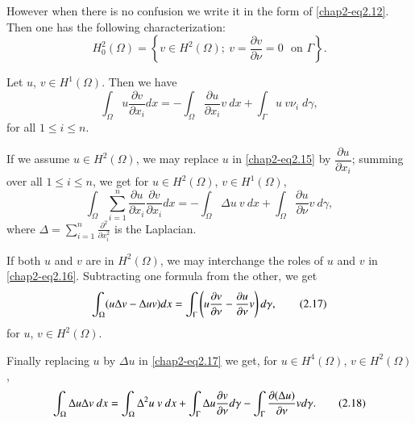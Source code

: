 However when there is no confusion we write it in the form of
\eqref{chap2-eq2.12}. Then one has the following characterization:
\begin{equation*}
H^{2}_{0}(\Omega)=\left\{v\in H^{2}(\Omega);\ v=\frac{\partial
  v}{\partial\nu}=0\text{~ on~
}\Gamma\right\}.\tag{2.14}\label{chap2-eq2.14} 
\end{equation*}

\begin{theorem}\label{chap2-thm2.5}
Let $u$, $v\in H^{1}(\Omega)$. Then we have
\begin{equation*}
\int_{\Omega}u\frac{\partial v}{\partial
  x_{i}}dx=-\int_{\Omega}\frac{\partial u}{\partial
  x_{i}}v\ dx+\int_{\Gamma}u\ v\nu_{i} \; d\gamma,\tag{2.15}\label{chap2-eq2.15} 
\end{equation*}
for all $1\leq i\leq n$.
\end{theorem}

If we assume $u\in H^{2}(\Omega)$, we may replace $u$ in
\eqref{chap2-eq2.15} by $\dfrac{\partial u}{\partial x_{i}}$; summing
over all $1\leq i\leq n$, we get for $u\in H^{2}(\Omega)$, $v\in
H^{1}(\Omega)$, 
\begin{equation*}
\int_{\Omega}\sum^{n}_{i=1}\frac{\partial u}{\partial
  x_{i}}\frac{\partial v}{\partial x_{i}}dx=-\int_{\Omega}\Delta
u\ v\ dx+\int_{\Omega}\frac{\partial u}{\partial
  \nu}v\ d\gamma,\tag{2.16}\label{chap2-eq2.16} 
\end{equation*}
where $\Delta=\sum^{n}_{i=1}\frac{\partial^{2}}{\partial x^{2}_{i}}$
is the Laplacian.

If both $u$ and $v$ are in $H^{2}(\Omega)$, we may interchange the
roles of $u$ and $v$ in \eqref{chap2-eq2.16}. Subtracting one formula
from the other, we get 
\begin{equation*}
\int_{\Omega}(u\Delta v-\Delta uv)dx=\int_{\Gamma}\left(u\frac{\partial
  v}{\partial \nu}-\frac{\partial u}{\partial
  \nu}v\right)d\gamma,\tag{2.17}\label{chap2-eq2.17} 
\end{equation*}\pageoriginale
for $u$, $v\in H^{2}(\Omega)$.

Finally replacing $u$ by $\Delta u$ in \eqref{chap2-eq2.17} we get,
for $u\in H^{4}(\Omega)$, $v\in H^{2}(\Omega)$,
\begin{equation*}
\int_{\Omega}\Delta u\Delta
v\ dx=\int_{\Omega}\Delta^{2}u\ v\ dx+\int_{\Gamma}\Delta u\frac{\partial
  v}{\partial \nu}d\gamma-\int_{\Gamma}\frac{\partial(\Delta u)}{\partial
  \nu}vd\gamma.\tag{2.18}\label{chap2-eq2.18} 
\end{equation*}

